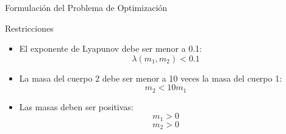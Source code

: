 \begin{frame}{Formulación del Problema de Optimización}
\begin{block}{Restricciones}
  \begin{itemize}
      \item El exponente de Lyapunov debe ser menor a 0.1:
      $$ \lambda(m_1, m_2) < 0.1 $$
      \item La masa del cuerpo 2 debe ser menor a 10 veces la masa del cuerpo 1:
      $$ m_2 < 10 m_1 $$
      \item Las masas deben ser positivas:
      $$ m_1 > 0 $$
      $$ m_2 > 0 $$
  \end{itemize}
\end{block}

\end{frame}